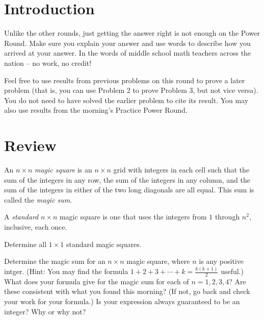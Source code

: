 \documentclass[11pt]{article}
\renewenvironment{problem}{\begin{problems}}{\end{problems}\vspace{5pt}}
\begin{document}
\setlength{\parindent}{0pt}

\section{Introduction}

Unlike the other rounds, just getting the answer right is not enough on the Power Round. 
Make sure you explain your answer and use words to describe how you arrived at your answer. 
In the words of middle school math teachers across the nation -- no work, no credit! \newline

Feel free to use results from previous problems on this round to prove a later problem 
(that is, you can use Problem 2 to prove Problem 3, but not vice versa). 
You do not need to have solved the earlier problem to cite its result.
You may also use results from the morning's Practice Power Round.

\section{Review}

\begin{definition}
An $n \times n$ \textit{magic square} is an $n \times n$ grid with integers in each cell such that
the sum of the integers in any row, the sum of the integers in any column, and the sum of the integers
in either of the two long diagonals are all equal. This sum is called the \textit{magic sum}.
\end{definition}

\begin{definition}
A \textit{standard} $n \times n$ magic square is one that uses the integers from $1$ through $n^2$, inclusive, each once.
\end{definition}

\begin{problem}[1 point]
Determine all $1 \times 1$ standard magic squares.
\end{problem}

\begin{problem}[5 points]
Determine the magic sum for an $n \times n$ magic square, where $n$ is any positive intger.
(Hint: You may find the formula $1 + 2 + 3 + \cdots + k = \frac{k(k+1)}{2}$ useful.)
What does your formula give for the magic sum for each of $n = 1, 2, 3, 4$?
Are these consistent with what you found this morning?
(If not, go back and check your work for your formula.)
Is your expression always guaranteed to be an integer? Why or why not?
\end{problem}
\end{document}
